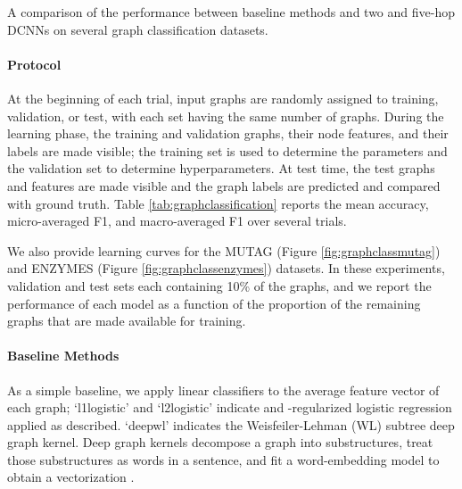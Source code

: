 \documentclass{article}
\begin{document}
\begin{table}[h]
    \vspace{10pt}
    
    \caption{A comparison of the performance between baseline methods and two and five-hop DCNNs on several graph classification datasets.}
    \label{tab:graphclassification}
\end{table}

\paragraph{Protocol} At the beginning of each trial, input graphs are randomly assigned to training, validation, or test, with each set having the same number of graphs.  During the learning phase, the training and validation graphs, their node features, and their labels are made visible; the training set is used to determine the parameters and the validation set to determine hyperparameters.  At test time, the test graphs and features are made visible and the graph labels are predicted and compared with ground truth.  Table \ref{tab:graphclassification} reports the mean accuracy, micro-averaged F1, and macro-averaged F1 over several trials.

We also provide learning curves for the MUTAG (Figure \ref{fig:graphclassmutag}) and ENZYMES (Figure \ref{fig:graphclassenzymes}) datasets.  In these experiments, validation and test sets each containing 10\% of the graphs, and we report the performance of each model as a function of the proportion of the remaining graphs that are made available for training.  

\paragraph{Baseline Methods} As a simple baseline, we apply linear classifiers to the average feature vector of each graph; `l1logistic' and `l2logistic' indicate  and -regularized logistic regression applied as described.  `deepwl' indicates the Weisfeiler-Lehman (WL) subtree deep graph kernel.  Deep graph kernels decompose a graph into substructures, treat those substructures as words in a sentence, and fit a word-embedding model to obtain a vectorization \cite{Yanardag:2015fm}. 
\end{document}
